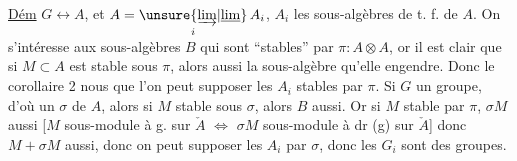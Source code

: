 \uline{Dém} $G\longleftrightarrow A$,  et $A=\underset{i}{\unsure{\underrightarrow{\lim}|\underline{\lim}}}\,A_i$, $A_i$ les sous-algèbres de t. f. de $A$. On s'intéresse aux sous-algèbres $B$ qui sont ``stables'' par $\pi:A\otimes A$, or il est clair que si
$M\subset A$ est stable sous $\pi$, alors aussi la sous-algèbre  qu'elle engendre. Donc le corollaire 2 nous  que l'on peut supposer les $A_i$ stables par $\pi$. Si $G$ un groupe, d'où un 
$\sigma$ de $A$, alors si $M$ stable sous $\sigma$, alors  $B$ aussi. Or si $M$ stable par $\pi$, $\sigma M$ aussi [$M$ sous-module à g.  sur $\check A$ $\Longleftrightarrow$ $\sigma M$ sous-module à dr (g) sur $\check A$] donc $M+\sigma M$ aussi, donc on peut supposer les $A_i$   par $\sigma$, donc les $G_i$ sont des groupes.

